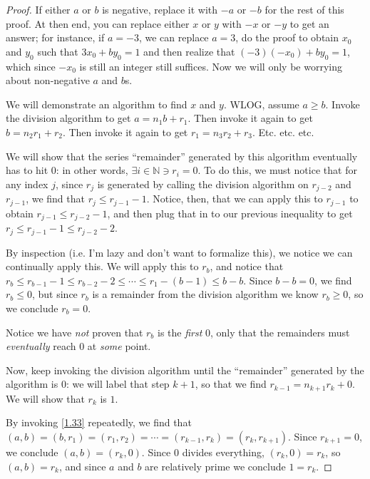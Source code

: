 \documentclass[../main.tex]{subfiles}
\begin{document}
\begin{proof}
  If either $a$ or $b$ is negative, replace it with $-a$ or $-b$ for the rest of this proof. At then end, you can replace either $x$ or $y$ with $-x$ or $-y$ to get an answer; for instance, if $a = -3$, we can replace $a = 3$, do the proof to obtain $x_0$ and $y_0$ such that $3x_0 + by_0 = 1$ and then realize that $(-3)(-x_0) + by_0 = 1$, which since $-x_0$ is still an integer still suffices. Now we will only be worrying about non-negative $a$ and $b$s.

  We will demonstrate an algorithm to find $x$ and $y$. WLOG, assume $a \geq b$. Invoke the division algorithm to get $a = n_1 b + r_1$. Then invoke it again to get $b = n_2 r_1 + r_2$. Then invoke it again to get $r_1 = n_3 r_2 + r_3$. Etc. etc. etc.

  We will show that the series ``remainder'' generated by this algorithm eventually has to hit $0$: in other words, $\exists i \in \mathbb{N} \ni r_i = 0$. To do this, we must notice that for any index $j$, since $r_j$ is generated by calling the division algorithm on $r_{j-2}$ and $r_{j-1}$, we find that $r_j \leq r_{j-1}-1$.
  Notice, then, that we can apply this to $r_{j-1}$ to obtain $r_{j-1} \leq r_{j-2} - 1$, and then plug that in to our previous inequality to get $r_{j} \leq r_{j-1} - 1 \leq r_{j-2} - 2$.

  By inspection (i.e. I'm lazy and don't want to formalize this), we notice we can continually apply this. We will apply this to $r_b$, and notice that $r_b \leq r_{b-1} - 1 \leq r_{b-2} - 2 \leq \cdots \leq r_{1} - (b - 1) \leq b - b$. Since $b-b = 0$, we find $r_b \leq 0$, but since $r_b$ is a remainder from the division algorithm we know $r_b \geq 0$, so we conclude $r_b = 0$.

  Notice we have \emph{not} proven that $r_b$ is the \emph{first} $0$, only that the remainders must \emph{eventually} reach $0$ at \emph{some} point.

  Now, keep invoking the division algorithm until the ``remainder'' generated by the algorithm is $0$: we will label that step $k+1$, so that we find $r_{k-1} = n_{k+1} r_k + 0$. We will show that $r_k$ is $1$.

  By invoking \ref{1.33} repeatedly, we find that $(a, b) = (b, r_1) = (r_1, r_2) = \cdots = (r_{k-1}, r_k) = (r_k, r_{k+1})$. Since $r_{k+1} = 0$, we conclude $(a, b) = (r_k, 0)$. Since $0$ divides everything, $(r_k, 0) = r_k$, so $(a, b) = r_k$, and since $a$ and $b$ are relatively prime we conclude $1 = r_k$.


\end{proof}
\end{document}
